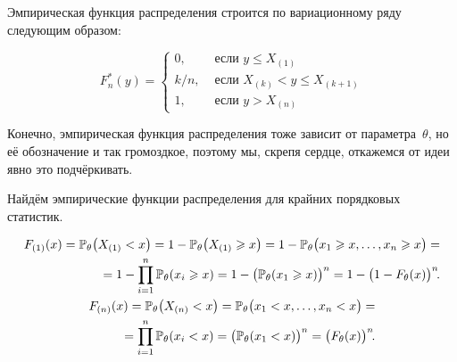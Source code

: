 Эмпирическая функция распределения строится по вариационному ряду следующим образом:

\begin{equation*}
    F_{n}^{*}(y)=\left\{\begin{array}{ll}
    0, & \text { если } y \leqslant X_{(1)} \\
    k/n, & \text { если } X_{(k)}<y \leqslant X_{(k+1)} \\
    1, & \text { если } y> X_{(n)}
    \end{array}\right.
\end{equation*}

Конечно, эмпирическая функция распределения тоже зависит от параметра~$\theta$, но её обозначение и так громоздкое, поэтому мы, скрепя сердце, откажемся от идеи явно это подчёркивать.

\begin{exmp}
    Найдём эмпирические функции распределения для крайних порядковых статистик.

    \begin{gather*}
        \begin{aligned}
            F_{(1)}(x)=\mathbb{P}_{\theta} \bigl(X_{(1)} < x \bigr) 
        = 1 - \mathbb{P}_{\theta} \bigl(X_{(1)} \geqslant x \bigr) 
        = 1 - \mathbb{P}_{\theta} \bigl(x_{1} \geqslant x, \ldots, x_{n} \geqslant x\bigr) = \\
        = 1 - \prod_{i=1}^{n} \mathbb{P}_{\theta} (x_{i} \geqslant x) 
        = 1 - \bigl(\mathbb{P}_{\theta} ({x}_{1} \geqslant x)\bigr)^{n} 
        = 1 - \bigl(1 - F_{\theta}(x)\bigr)^{n}\!.
        \end{aligned} \\
        \begin{aligned}
            F_{(n)}(x) 
            = \mathbb{P}_{\theta} \bigl(X_{(n)} < x\bigr) 
            = \mathbb{P}_{\theta} \bigl(x_{1} < x, \ldots, x_{n} < x\bigr) = \\
            = \prod_{i=1}^{n} \mathbb{P}_{\theta} (x_{i} < x) 
            = \bigl(\mathbb{P}_{\theta} ({x}_{1} < x)\bigr)^{n} 
            = \bigl( F_{\theta}(x) \bigr)^n \!.
        \end{aligned}
    \end{gather*}
\end{exmp}

